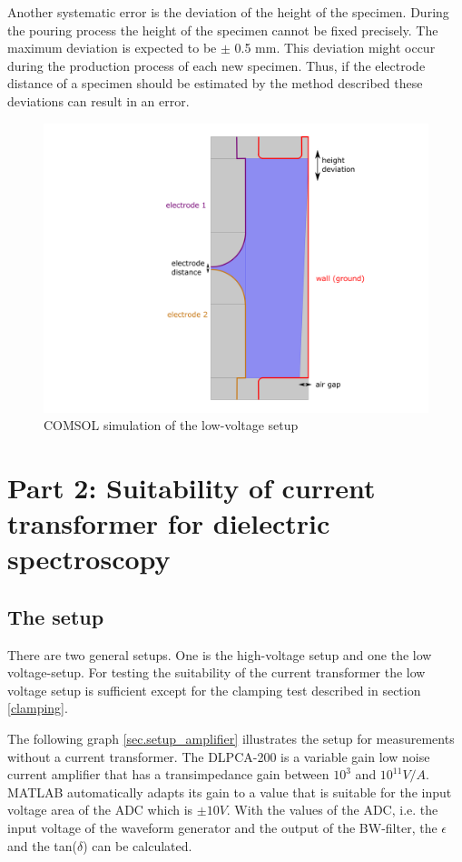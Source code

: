 Another systematic error is the deviation of the height of the specimen. During  the pouring process the height of the specimen cannot be fixed precisely. The maximum deviation is expected to be $\pm$ 0.5 mm. This deviation might occur during the production process of each new specimen. Thus, if the electrode distance of a specimen should be estimated by the method described these deviations can result in an error. 
 \begin{figure}[htbp]
	\centering
	\includegraphics[width=\textwidth]{figures/Method/Part1_d_C0/cell_colour.png}		
	\caption[Kurze Abbildungsbeschreibung]{COMSOL simulation of the low-voltage setup} 
	\label{fig.syserrors}
\end{figure}

\section{Part 2:  Suitability of current transformer for dielectric spectroscopy}
\subsection{The setup}
There are two general setups. One is the high-voltage setup and one the low voltage-setup. For testing the suitability of the current transformer the low voltage setup is sufficient except for the clamping test described in section \ref{clamping}. 

The following graph \ref{sec.setup_amplifier} illustrates the setup for measurements without a current transformer. The DLPCA-200 is a variable gain low noise current amplifier that has a transimpedance gain between $10^3$ and $10^{11} V/A$. MATLAB automatically adapts its gain to a value that is suitable for the input voltage area of the ADC which is $\pm 10V$. With the values of the ADC, i.e. the input voltage of the waveform generator and the output of the BW-filter, the $\epsilon$ and the tan($\delta$) can be calculated. 

